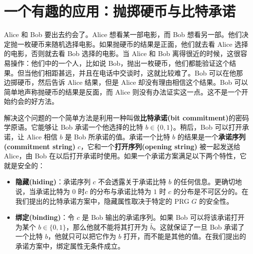 \section{一个有趣的应用：抛掷硬币与比特承诺}\label{sec:3-12}

Alice 和 Bob 要出去约会了。Alice 想看某一部电影，而 Bob 想看另一部。他们决定抛一枚硬币来随机选择电影。如果抛硬币的结果是正面，他们就去看 Alice 选择的电影，否则就去看 Bob 选择的电影。当 Alice 和 Bob 离得很近的时候，这很容易操作：他们中的一个人，比如说 Bob，抛出一枚硬币，他们都能验证这个结果。但当他们相距甚远，并且在电话中交谈时，这就比较难了。Bob 可以在他那边掷硬币，然后告诉 Alice 结果，但是 Alice 却没有理由相信这个结果。Bob 可以简单地声称抛硬币的结果是反面，而 Alice 则没有办法证实这一点。这不是一个开始约会的好方法。

解决这个问题的一个简单方法是利用一种叫做\textbf{比特承诺(bit commitment)}的密码学原语。它能够让 Bob 承诺一个他选择的比特 $b\in\{0,1\}$。稍后，Bob 可以打开承诺，让 Alice 相信 $b$ 是 Bob 所承诺的值。承诺一个比特 $b$ 的结果是一个\textbf{承诺序列(commitment string)} $c$，它和一个\textbf{打开序列(opening string)} 被一起发送给 Alice，由 Bob 在以后打开承诺时使用。如果一个承诺方案满足以下两个特性，它就是安全的：
\begin{itemize}
	\item \textbf{隐藏(hiding)}：承诺序列 $c$ 不会透露关于承诺比特 $b$ 的任何信息。更确切地说，当承诺比特为 $0$ 时$c$ 的分布与承诺比特为 $1$ 时 $c$ 的分布是不可区分的。在我们提出的比特承诺方案中，隐藏属性取决于特定的 PRG $G$ 的安全性。
	\item \textbf{绑定(binding)}：令 $c$ 是 Bob 输出的承诺序列。如果 Bob 可以将该承诺打开为某个 $b\in\{0,1\}$，那么他就不能将其打开为 $\bar{b}$。这就保证了一旦 Bob 承诺了一个比特 $b$，他就只可以把它作为 $b$ 打开，而不能是其他的值。在我们提出的承诺方案中，绑定属性无条件成立。
\end{itemize}

